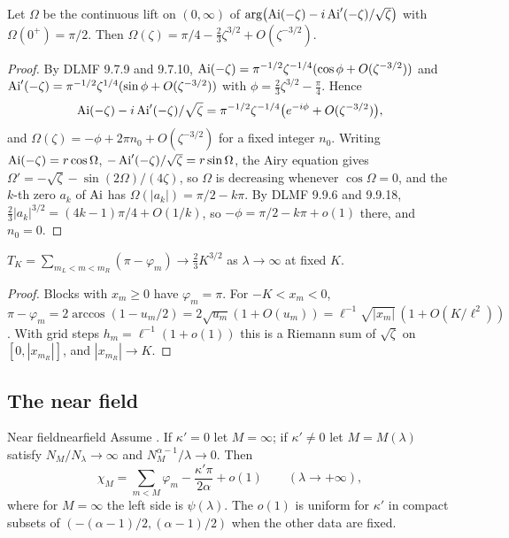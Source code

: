 \begin{lemma}\label{lem:airyphase}
Let $\Omega$ be the continuous lift on $(0,\infty)$ of
$\arg\bigl(\operatorname{Ai}(-\zeta)-i\operatorname{Ai}'(-\zeta)/\sqrt\zeta\bigr)$ with $\Omega(0^+)=\pi/2$. Then
$\Omega(\zeta)=\pi/4-\tfrac23\zeta^{3/2}+O(\zeta^{-3/2})$.
\end{lemma}

\begin{proof}
By DLMF 9.7.9 and 9.7.10, $\operatorname{Ai}(-\zeta)=\pi^{-1/2}\zeta^{-1/4}(\cos\phi+O(\zeta^{-3/2}))$ and
$\operatorname{Ai}'(-\zeta)=\pi^{-1/2}\zeta^{1/4}(\sin\phi+O(\zeta^{-3/2}))$ with $\phi=\frac23\zeta^{3/2}-\frac\pi4$.
Hence
\[
  \operatorname{Ai}(-\zeta)-i\operatorname{Ai}'(-\zeta)/\sqrt\zeta=\pi^{-1/2}\zeta^{-1/4}\bigl(e^{-i\phi}+O(\zeta^{-3/2})\bigr),
\]
and $\Omega(\zeta)=-\phi+2\pi n_0+O(\zeta^{-3/2})$ for a fixed integer $n_0$. Writing
$\operatorname{Ai}(-\zeta)=r\cos\Omega$, $-\operatorname{Ai}'(-\zeta)/\sqrt\zeta=r\sin\Omega$, the Airy equation gives
$\Omega'=-\sqrt\zeta-\sin(2\Omega)/(4\zeta)$, so $\Omega$ is decreasing whenever
$\cos\Omega=0$, and the $k$-th zero $a_k$ of $\operatorname{Ai}$ has $\Omega(|a_k|)=\pi/2-k\pi$. By DLMF
9.9.6 and 9.9.18, $\frac23|a_k|^{3/2}=(4k-1)\pi/4+O(1/k)$, so $-\phi=\pi/2-k\pi+o(1)$ there,
and $n_0=0$.
\end{proof}

\begin{lemma}\label{lem:turningsum}
$T_K=\sum_{m_L<m<m_R}(\pi-\varphi_m)\to\frac23K^{3/2}$ as $\lambda\to\infty$ at fixed $K$.
\end{lemma}

\begin{proof}
Blocks with $x_m\ge0$ have $\varphi_m=\pi$. For $-K<x_m<0$,
$\pi-\varphi_m=2\arccos(1-u_m/2)=2\sqrt{u_m}(1+O(u_m))=\ell^{-1}\sqrt{|x_m|}\,(1+O(K/\ell^2))$.
With grid steps $h_m=\ell^{-1}(1+o(1))$ this is a Riemann sum of $\sqrt\zeta$ on
$[0,|x_{m_R}|]$, and $|x_{m_R}|\to K$.
\end{proof}

\subsection{The near field}

\begin{proposition}{Near field}{nearfield}
Assume . If $\kappa'=0$ let $M=\infty$; if $\kappa'\ne0$ let
$M=M(\lambda)$ satisfy $N_M/N_\lambda\to\infty$ and $N_M^{\alpha-1}/\lambda\to0$. Then
\[
  \chi_M=\sum_{m<M}\varphi_m-\frac{\kappa'\pi}{2\alpha}+o(1)\qquad(\lambda\to+\infty),
\]
where for $M=\infty$ the left side is $\psi(\lambda)$. The $o(1)$ is uniform for $\kappa'$ in
compact subsets of $(-(\alpha-1)/2,(\alpha-1)/2)$ when the other data are fixed.
\end{proposition}

